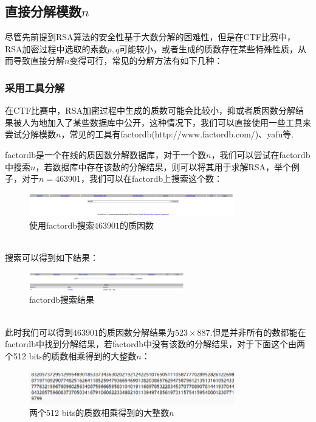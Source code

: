 \documentclass{book}
\numberwithin{equation}{subsubsection}
\begin{document}
\subsection{直接分解模数$n$}
尽管先前提到RSA算法的安全性基于大数分解的困难性，但是在CTF比赛中，RSA加密过程中选取的素数$p,q$可能较小，或者生成的质数存在某些特殊性质，从而导致直接分解$n$变得可行，常见的分解方法有如下几种：
\subsubsection{采用工具分解}

在CTF比赛中，RSA加密过程中生成的质数可能会比较小，抑或者质因数分解结果被人为地加入了某些数据库中公开，这种情况下，我们可以直接使用一些工具来尝试分解模数$n$，常见的工具有factordb(http://www.factordb.com/)、yafu等.\par
factordb是一个在线的质因数分解数据库，对于一个数$n$，我们可以尝试在factordb中搜索$n$，若数据库中存在该数的分解结果，则可以将其用于求解RSA，举个例子，对于$n=463901$，我们可以在factordb上搜索这个数：\\
\begin{figure}[h]
    \centering
    \includegraphics[width=0.8\textwidth]{Picture/factordb_search.png}
    \caption{使用factordb搜索$463901$的质因数}
\end{figure}\\
搜索可以得到如下结果：\\
\begin{figure}[h]
    \centering
    \includegraphics[width=0.6\textwidth]{Picture/factordb_result.png}
    \caption{factordb搜索结果}
\end{figure}\\
此时我们可以得到$463901$的质因数分解结果为$523\times 887$.但是并非所有的数都能在factordb中找到分解结果，若factordb中没有该数的分解结果，对于下面这个由两个512 bits的质数相乘得到的大整数$n$：\\
\begin{figure}[h]
    \centering
    \includegraphics[width=0.8\textwidth]{Picture/ABigNumber.png}
    \caption{两个512 bits的质数相乘得到的大整数$n$}
\end{figure}\\
\end{document}
